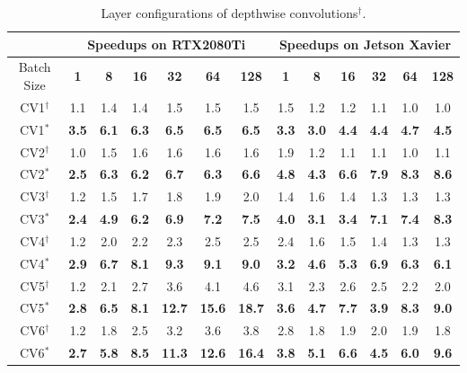 \begin{table}[]
\setlength{\tabcolsep}{3.8pt}
\caption{Layer configurations of depthwise convolutions$^{\dag}$.}
\label{tab:dwconv}
\begin{threeparttable}
\begin{tabular}{c|cccccc|cccccc}
\toprule
&\multicolumn{6}{c|}{Speedups on RTX2080Ti} & \multicolumn{6}{c}{Speedups on Jetson Xavier}\\

\midrule
Batch Size& \textbf{1} & \textbf{8} & \textbf{16}& \textbf{32} & \textbf{64} & \textbf{128} & \textbf{1} & \textbf{8} & \textbf{16}& \textbf{32} & \textbf{64} & \textbf{128}\\
CV1$^{\dag}$&1.1 &1.4 &1.4 &1.5 &1.5 &1.5 &1.5 &1.2 &1.2 &1.1 &1.0 &1.0 \\
CV1$^{*}$&\textbf{3.5} &\textbf{6.1} &\textbf{6.3} &\textbf{6.5} &\textbf{6.5} &\textbf{6.5} &\textbf{3.3} &\textbf{3.0} &\textbf{4.4} &\textbf{4.4} &\textbf{4.7} &\textbf{4.5} \\
\hline
CV2$^{\dag}$&1.0 &1.5 &1.6 &1.6 &1.6 &1.6 &1.9 &1.2 &1.1 &1.1 &1.0 &1.1 \\
CV2$^{*}$&\textbf{2.5} &\textbf{6.3} &\textbf{6.2} &\textbf{6.7} &\textbf{6.3} &\textbf{6.6} &\textbf{4.8} &\textbf{4.3} &\textbf{6.6} &\textbf{7.9} &\textbf{8.3} &\textbf{8.6} \\
\hline
CV3$^{\dag}$&1.2 &1.5 &1.7 &1.8 &1.9 &2.0 &1.4 &1.6 &1.4 &1.3 &1.3 &1.3 \\
CV3$^{*}$&\textbf{2.4} &\textbf{4.9} &\textbf{6.2} &\textbf{6.9} &\textbf{7.2} &\textbf{7.5} &\textbf{4.0} &\textbf{3.1} &\textbf{3.4} &\textbf{7.1} &\textbf{7.4} &\textbf{8.3} \\
\hline
CV4$^{\dag}$&1.2 &2.0 &2.2 &2.3 &2.5 &2.5 &2.4 &1.6 &1.5 &1.4 &1.3 &1.3 \\
CV4$^{*}$&\textbf{2.9} &\textbf{6.7} &\textbf{8.1} &\textbf{9.3} &\textbf{9.1} &\textbf{9.0} &\textbf{3.2} &\textbf{4.6} &\textbf{5.3} &\textbf{6.9} &\textbf{6.3} &\textbf{6.1} \\
\hline
CV5$^{\dag}$&1.2 &2.1 &2.7 &3.6 &4.1 &4.6 &3.1 &2.3 &2.6 &2.5 &2.2 &2.0 \\
CV5$^{*}$&\textbf{2.8} &\textbf{6.5} &\textbf{8.1} &\textbf{12.7} &\textbf{15.6} &\textbf{18.7} &\textbf{3.6} &\textbf{4.7} &\textbf{7.7} &\textbf{3.9} &\textbf{8.3} &\textbf{9.0} \\
\hline
CV6$^{\dag}$&1.2 &1.8 &2.5 &3.2 &3.6 &3.8 &2.8 &1.8 &1.9 &2.0 &1.9 &1.8 \\
CV6$^{*}$&\textbf{2.7} &\textbf{5.8} &\textbf{8.5} &\textbf{11.3} &\textbf{12.6} &\textbf{16.4} &\textbf{3.8} &\textbf{5.1} &\textbf{6.6} &\textbf{4.5} &\textbf{6.0} &\textbf{9.6} \\

\end{tabular}
\end{threeparttable}
\end{table}
